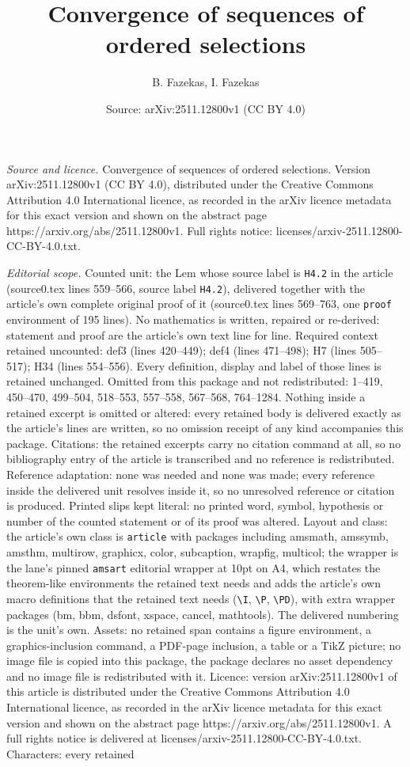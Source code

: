 \documentclass[10pt,a4paper]{amsart}
\title[Convergence of sequences of ordered selections]{Convergence of sequences of ordered selections}
\author{B. Fazekas, I. Fazekas}
\date{Source: arXiv:2511.12800v1 (CC BY 4.0)}
\begin{document}
\maketitle

\noindent\emph{Source and licence.} Convergence of sequences of ordered selections. Version arXiv:2511.12800v1 (CC BY 4.0), distributed under the Creative Commons Attribution 4.0 International licence, as recorded in the arXiv licence metadata for this exact version and shown on the abstract page https://arxiv.org/abs/2511.12800v1. Full rights notice: licenses/arxiv-2511.12800-CC-BY-4.0.txt.\par\smallskip

\noindent\textit{Editorial scope.} Counted unit: the Lem whose source label is \texttt{H4.2} in the article (source0.tex lines 559--566, source label \texttt{H4.2}), delivered together with the article's own complete original proof of it (source0.tex lines 569--763, one \texttt{proof} environment of 195 lines). No mathematics is written, repaired or re-derived: statement and proof are the article's own text line for line. Required context retained uncounted: def3 (lines 420--449); def4 (lines 471--498); H7 (lines 505--517); H34 (lines 554--556). Every definition, display and label of those lines is retained unchanged. Omitted from this package and not redistributed: 1--419, 450--470, 499--504, 518--553, 557--558, 567--568, 764--1284. Nothing inside a retained excerpt is omitted or altered: every retained body is delivered exactly as the article's lines are written, so no omission receipt of any kind accompanies this package. Citations: the retained excerpts carry no citation command at all, so no bibliography entry of the article is transcribed and no reference is redistributed. Reference adaptation: none was needed and none was made; every reference inside the delivered unit resolves inside it, so no unresolved reference or citation is produced. Printed slips kept literal: no printed word, symbol, hypothesis or number of the counted statement or of its proof was altered. Layout and class: the article's own class is \texttt{article} with packages including amsmath, amssymb, amsthm, multirow, graphicx, color, subcaption, wrapfig, multicol; the wrapper is the lane's pinned \texttt{amsart} editorial wrapper at 10pt on A4, which restates the theorem-like environments the retained text needs and adds the article's own macro definitions that the retained text needs (\texttt{\textbackslash I}, \texttt{\textbackslash P}, \texttt{\textbackslash PD}), with extra wrapper packages (bm, bbm, dsfont, xspace, cancel, mathtools). The delivered numbering is the unit's own. Assets: no retained span contains a figure environment, a graphics-inclusion command, a PDF-page inclusion, a table or a TikZ picture; no image file is copied into this package, the package declares no asset dependency and no image file is redistributed with it. Licence: version arXiv:2511.12800v1 of this article is distributed under the Creative Commons Attribution 4.0 International licence, as recorded in the arXiv licence metadata for this exact version and shown on the abstract page https://arxiv.org/abs/2511.12800v1. A full rights notice is delivered at licenses/arxiv-2511.12800-CC-BY-4.0.txt. Characters: every retained 
\end{document}
